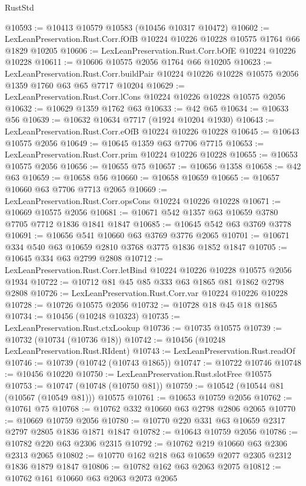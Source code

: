 \begin{lexlean}{RustStd}
\begin{coremodule}
{\begin{coremodule}
{{{{{@10593 := @10413 @10579 @10583 (@10456 @10317 @10472)
@10602 := LexLeanPreservation.Rust.Corr.fOfB @10224 @10226 @10228 @10575 @1764 @66 @1829 @10205
@10606 := LexLeanPreservation.Rust.Corr.bOfE @10224 @10226 @10228
@10611 := @10606 @10575 @2056 @1764 @66 @10205
@10623 := LexLeanPreservation.Rust.Corr.buildPair
    @10224
    @10226
    @10228
    @10575
    @2056
    @1359
    @1760
    @63
    @65
    @7717
    @10204
@10629 := LexLeanPreservation.Rust.Corr.lCons @10224 @10226 @10228 @10575 @2056
@10632 := @10629 @1359 @1762 @63
@10633 := @42 @65
@10634 := @10633 @56
@10639 := @10632 @10634 @7717 (@1924 @10204 @1930)
@10643 := LexLeanPreservation.Rust.Corr.eOfB @10224 @10226 @10228
@10645 := @10643 @10575 @2056
@10649 := @10645 @1359 @63 @7706 @7715
@10653 := LexLeanPreservation.Rust.Corr.prim @10224 @10226 @10228
@10655 := @10653 @10575 @2056
@10656 := @10655 @75
@10657 := @10656 @1358
@10658 := @42 @63
@10659 := @10658 @56
@10660 := @10658 @10659
@10665 := @10657 @10660 @63 @7706 @7713 @2065
@10669 := LexLeanPreservation.Rust.Corr.opsCons @10224 @10226 @10228
@10671 := @10669 @10575 @2056
@10681 := @10671 @542 @1357 @63 @10659 @3780 @7705 @7712 @1836 @1841 @1847
@10685 := @10645 @542 @63 @3769 @3778
@10691 := @10656 @541 @10660 @63 @3769 @3776 @2065
@10701 := @10671 @334 @540 @63 @10659 @2810 @3768 @3775 @1836 @1852 @1847
@10705 := @10645 @334 @63 @2799 @2808
@10712 := LexLeanPreservation.Rust.Corr.letBind @10224 @10226 @10228 @10575 @2056 @1934
@10722 := @10712 @81 @45 @85 @333 @63 @1865 @81 @1862 @2798 @2808
@10726 := LexLeanPreservation.Rust.Corr.var @10224 @10226 @10228
@10728 := @10726 @10575 @2056
@10732 := @10728 @18 @45 @18 @1865
@10734 := @10456 (@10248 @10323)
@10735 := LexLeanPreservation.Rust.ctxLookup
@10736 := @10735 @10575
@10739 := @10732 (@10734 (@10736 @18))
@10742 := @10456 (@10248 LexLeanPreservation.Rust.RIdent)
@10743 := LexLeanPreservation.Rust.readOf
@10746 := @10739 (@10742 (@10743 @1865))
@10747 := @10722 @10746
@10748 := @10456 @10220
@10750 := LexLeanPreservation.Rust.slotFree @10575
@10753 := @10747 (@10748 (@10750 @81))
@10759 := @10542 (@10544 @81 (@10567 (@10549 @81))) @10575
@10761 := @10653 @10759 @2056
@10762 := @10761 @75
@10768 := @10762 @332 @10660 @63 @2798 @2806 @2065
@10770 := @10669 @10759 @2056
@10780 := @10770 @220 @331 @63 @10659 @2317 @2797 @2805 @1836 @1871 @1847
@10782 := @10643 @10759 @2056
@10786 := @10782 @220 @63 @2306 @2315
@10792 := @10762 @219 @10660 @63 @2306 @2313 @2065
@10802 := @10770 @162 @218 @63 @10659 @2077 @2305 @2312 @1836 @1879 @1847
@10806 := @10782 @162 @63 @2063 @2075
@10812 := @10762 @161 @10660 @63 @2063 @2073 @2065
}}}}}
\end{coremodule}}
\end{coremodule}
\end{lexlean}
